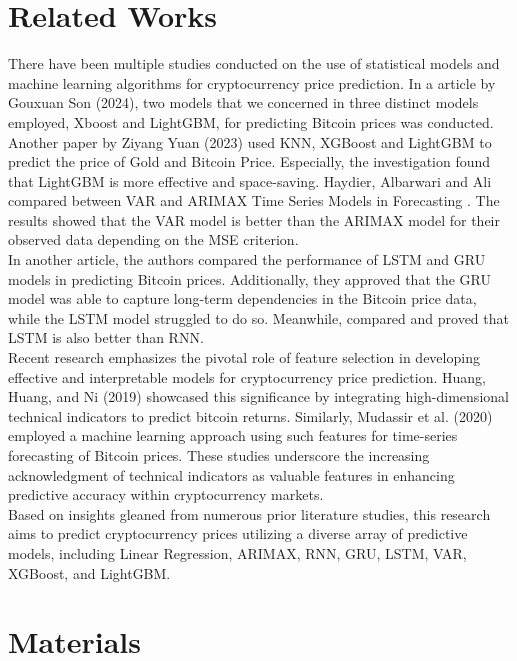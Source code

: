 \documentclass{ieeeojies}
\begin{document}
\section{Related Works}

\indent There have been multiple studies conducted on the use of statistical models and machine learning algorithms for cryptocurrency price prediction. In a article by Gouxuan Son (2024)\cite{b1}, two models that we concerned in three distinct models employed, Xboost and LightGBM, for predicting Bitcoin prices was conducted. Another paper by Ziyang Yuan (2023)\cite{b2} used KNN, XGBoost and LightGBM to predict the price of Gold and Bitcoin Price. Especially, the investigation found that LightGBM is more effective and space-saving.  Haydier, Albarwari and Ali compared  between  VAR  and  ARIMAX  Time  Series  Models  in Forecasting \cite{b3}. The results showed that the VAR model is better than the ARIMAX model for their observed data depending on the MSE criterion.\\
\indent In another article,\cite{b4} the authors compared the performance of LSTM and GRU models in predicting Bitcoin prices. Additionally, they approved that the GRU model was able to capture long-term dependencies in the Bitcoin price data, while the LSTM model struggled to do so. Meanwhile, \cite{b5} compared and proved that LSTM is also better than RNN.\\
\indent Recent research emphasizes the pivotal role of feature selection in developing effective and interpretable models for cryptocurrency price prediction. Huang, Huang, and Ni (2019) \cite{b6} showcased this significance by integrating high-dimensional technical indicators to predict bitcoin returns. Similarly, Mudassir et al. (2020) \cite{b7} employed a machine learning approach using such features for time-series forecasting of Bitcoin prices. These studies underscore the increasing acknowledgment of technical indicators as valuable features in enhancing predictive accuracy within cryptocurrency markets.\\
\indent Based on insights gleaned from numerous prior literature studies, this research aims to predict cryptocurrency prices utilizing a diverse array of predictive models, including Linear Regression, ARIMAX, RNN, GRU, LSTM, VAR, XGBoost, and LightGBM.

\section{Materials}
\end{document}
